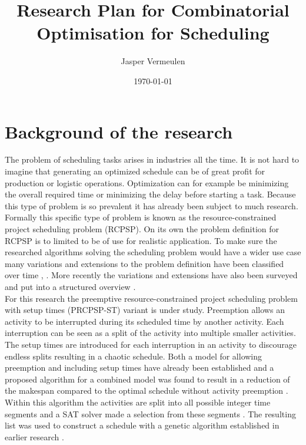 \documentclass[english]{article}
\title{Research Plan for Combinatorial Optimisation for Scheduling}
\author{Jasper Vermeulen}
\date{\today}
\begin{document}
\maketitle

\section*{Background of the research}
The problem of scheduling tasks arises in industries all the time. It is not hard to imagine that generating an optimized schedule can be of great profit for production or logistic operations. Optimization can for example be minimizing the overall required time or minimizing the delay before starting a task. Because this type of problem is so prevalent it has already been subject to much research.\\
Formally this specific type of problem is known as the resource-constrained project scheduling problem (RCPSP). On its own the problem definition for RCPSP is to limited to be of use for realistic application. To make sure the researched algorithms solving the scheduling problem would have a wider use case many variations and extensions to the problem definition have been classified over time \cite{RN9}, \cite{RN10}. More recently the variations and extensions have also been surveyed and put into a structured overview \cite{RN6}.\\
For this research the preemptive resource-constrained project scheduling problem with setup times (PRCPSP-ST) variant is under study. Preemption allows an activity to be interrupted during its scheduled time by another activity. Each interruption can be seen as a split of the activity into multiple smaller activities. The setup times are introduced for each interruption in an activity to discourage endless splits resulting in a chaotic schedule. Both a model for allowing preemption \cite{RN21} and including setup times \cite{RN13} have already been established and a proposed algorithm for a combined model was found to result in a reduction of the makespan compared to the optimal schedule without activity preemption \cite{RN1}. Within this algorithm the activities are split into all possible integer time segments and a SAT solver made a selection from these segments \cite{RN3}. The resulting list was used to construct a schedule with a genetic algorithm established in earlier research \cite{RN14}.\\
\end{document}
